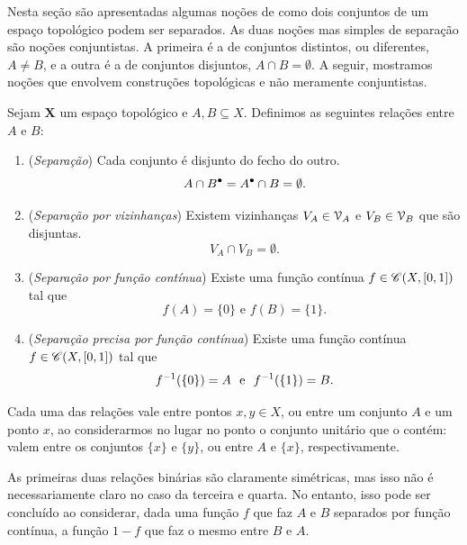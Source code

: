 Nesta seção são apresentadas algumas noções de como dois conjuntos de um espaço topológico podem ser separados. As duas noções mas simples de separação são noções conjuntistas. A primeira é a de conjuntos distintos, ou diferentes, $A \neq B$, e a outra é a de conjuntos disjuntos, $A \cap B = \emptyset$. A seguir, mostramos noções que envolvem construções topológicas e não meramente conjuntistas.

\begin{definition}
Sejam $\bm X$ um espaço topológico e $A,B \subseteq X$. Definimos as seguintes relações entre $A$ e $B$:
	\begin{enumerate}
	\item (\emph{Separação}) Cada conjunto é disjunto do fecho do outro.
	\begin{equation*}
	A \cap {B}^\bullet = {A}^\bullet \cap B = \emptyset.
	\end{equation*}
	\item (\emph{Separação por vizinhanças}) Existem vizinhanças $V_A \in \mathcal{V}_A$ e $V_B \in \mathcal{V}_B$ que são disjuntas.
	\begin{equation*}
	V_A \cap V_B = \emptyset.
	\end{equation*}
	\item (\emph{Separação por função contínua}) Existe uma função contínua $f \in \mathscr{C}(X,[0,1])$ tal que
	\begin{equation*}
	f(A)=\{0\} \text{\ \ e\ \ } f(B)=\{1\}.
	\end{equation*}
	\item (\emph{Separação precisa por função contínua}) Existe uma função contínua $f \in \mathscr{C}(X,[0,1])$ tal que
	\begin{equation*}
	f^{-1}(\{0\})=A \text{\ \ e\ \ } f^{-1}(\{1\})=B.
	\end{equation*}
	\end{enumerate}
Cada uma das relações vale entre pontos $x,y \in X$, ou entre um conjunto $A$ e um ponto $x$, ao considerarmos no lugar no ponto o conjunto unitário que o contém: valem entre os conjuntos $\{x\}$ e $\{y\}$, ou entre $A$ e $\{x\}$, respectivamente.
\end{definition}

	As primeiras duas relações binárias são claramente simétricas, mas isso não é necessariamente claro no caso da terceira e quarta. No entanto, isso pode ser concluído ao considerar, dada uma função $f$ que faz $A$ e $B$ separados por função contínua, a função $1-f$ que faz o mesmo entre $B$ e $A$.

